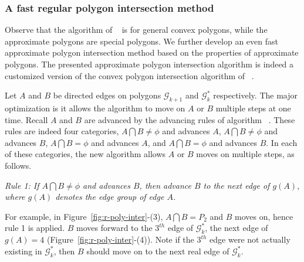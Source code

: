 
\subsubsection{A fast regular polygon intersection method}


Observe that the algorithm of ~\cite{ORourke:Intersection} is for general convex polygons, while the approximate polygons are special polygons. We further develop an even fast approximate polygon intersection method based on the properties of approximate polygons.
%
The presented approximate polygon intersection algorithm is indeed a customized version of the convex polygon intersection algorithm of ~\cite{ORourke:Intersection}.

Let $A$ and $B$ be directed edges on polygons $\mathcal{G}_{k+1}$ and $\mathcal{G}^*_k$ respectively. The major optimization is it allows the algorithm to move on $A$ or $B$ multiple steps at one time.
Recall $A$ and $B$ are advanced by the advancing rules of algorithm ~\cite{ORourke:Intersection}.
These rules are indeed four categories, \ie $A \bigcap B \ne \phi$ and advances $A$, $A \bigcap B \ne \phi$ and advances $B$, $A \bigcap B = \phi$ and advances $A$, and $A \bigcap B = \phi$ and advances $B$.
%
In each of these categories, the new algorithm allows $A$ or $B$ moves on multiple steps, as follows.


\sstab \emph{Rule 1:
If $A \bigcap B \ne \phi$ and advances $B$, then advance $B$ to \textcolor[rgb]{1.00,0.00,0.00}{the next edge }of $g(A)$, where $g(A)$ denotes the edge group of edge $A$.}

For example, in Figure~\ref{fig:r-poly-inter}-(3), $A \bigcap B = P_2$ and $B$ moves on, hence rule 1 is applied. $B$ moves forward to the $3^{th}$ edge of $\mathcal{G}^*_k$, \ie the next edge of $g(A) = 4$ (Figure~\ref{fig:r-poly-inter}-(4)).
Note if the $3^{th}$ edge were not actually existing in $\mathcal{G}^*_k$, then $B$ should move on to the next real edge of $\mathcal{G}^*_k$.


